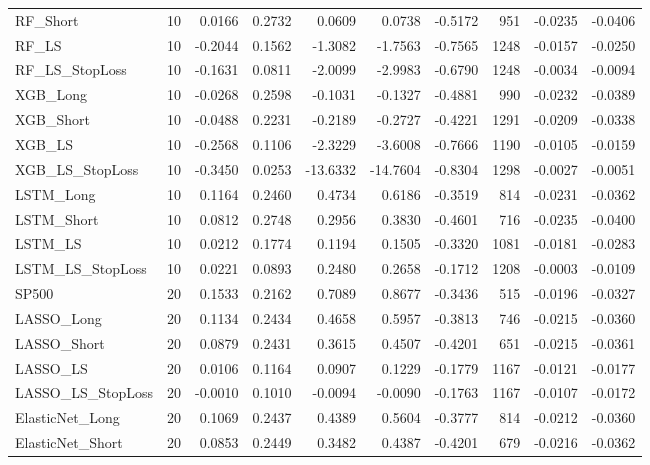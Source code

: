 \begin{tabular}{llrrrrrrrr}
\cline{1-10}
RF\_Short & 10 & 0.0166 & 0.2732 & 0.0609 & 0.0738 & -0.5172 & 951 & -0.0235 & -0.0406 \\
\cline{1-10}
RF\_LS & 10 & -0.2044 & 0.1562 & -1.3082 & -1.7563 & -0.7565 & 1248 & -0.0157 & -0.0250 \\
\cline{1-10}
RF\_LS\_StopLoss & 10 & -0.1631 & 0.0811 & -2.0099 & -2.9983 & -0.6790 & 1248 & -0.0034 & -0.0094 \\
\cline{1-10}
XGB\_Long & 10 & -0.0268 & 0.2598 & -0.1031 & -0.1327 & -0.4881 & 990 & -0.0232 & -0.0389 \\
\cline{1-10}
XGB\_Short & 10 & -0.0488 & 0.2231 & -0.2189 & -0.2727 & -0.4221 & 1291 & -0.0209 & -0.0338 \\
\cline{1-10}
XGB\_LS & 10 & -0.2568 & 0.1106 & -2.3229 & -3.6008 & -0.7666 & 1190 & -0.0105 & -0.0159 \\
\cline{1-10}
XGB\_LS\_StopLoss & 10 & -0.3450 & 0.0253 & -13.6332 & -14.7604 & -0.8304 & 1298 & -0.0027 & -0.0051 \\
\cline{1-10}
LSTM\_Long & 10 & 0.1164 & 0.2460 & 0.4734 & 0.6186 & -0.3519 & 814 & -0.0231 & -0.0362 \\
\cline{1-10}
LSTM\_Short & 10 & 0.0812 & 0.2748 & 0.2956 & 0.3830 & -0.4601 & 716 & -0.0235 & -0.0400 \\
\cline{1-10}
LSTM\_LS & 10 & 0.0212 & 0.1774 & 0.1194 & 0.1505 & -0.3320 & 1081 & -0.0181 & -0.0283 \\
\cline{1-10}
LSTM\_LS\_StopLoss & 10 & 0.0221 & 0.0893 & 0.2480 & 0.2658 & -0.1712 & 1208 & -0.0003 & -0.0109 \\
\cline{1-10}
SP500 & 20 & 0.1533 & 0.2162 & 0.7089 & 0.8677 & -0.3436 & 515 & -0.0196 & -0.0327 \\
\cline{1-10}
LASSO\_Long & 20 & 0.1134 & 0.2434 & 0.4658 & 0.5957 & -0.3813 & 746 & -0.0215 & -0.0360 \\
\cline{1-10}
LASSO\_Short & 20 & 0.0879 & 0.2431 & 0.3615 & 0.4507 & -0.4201 & 651 & -0.0215 & -0.0361 \\
\cline{1-10}
LASSO\_LS & 20 & 0.0106 & 0.1164 & 0.0907 & 0.1229 & -0.1779 & 1167 & -0.0121 & -0.0177 \\
\cline{1-10}
LASSO\_LS\_StopLoss & 20 & -0.0010 & 0.1010 & -0.0094 & -0.0090 & -0.1763 & 1167 & -0.0107 & -0.0172 \\
\cline{1-10}
ElasticNet\_Long & 20 & 0.1069 & 0.2437 & 0.4389 & 0.5604 & -0.3777 & 814 & -0.0212 & -0.0360 \\
\cline{1-10}
ElasticNet\_Short & 20 & 0.0853 & 0.2449 & 0.3482 & 0.4387 & -0.4201 & 679 & -0.0216 & -0.0362 \\

\end{tabular}

